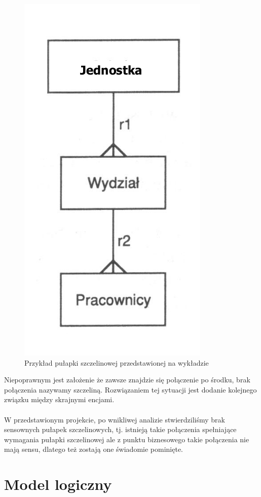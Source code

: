 \documentclass{mwrep}[15pt]
\begin{document}
\begin{figure}[H]
	\centering
	\includegraphics[scale=0.4]{./szczelina.png}
	\caption{Przykład pułapki szczelinowej przedstawionej na wykładzie\cite{Kowalczyk1}}
\end{figure}

Niepoprawnym jest założenie że zawsze znajdzie się połączenie po środku, brak połączenia nazywamy szczeliną. Rozwiązaniem 
tej sytuacji jest dodanie kolejnego związku między skrajnymi encjami. \\
\\
W przedstawionym projekcie, po wnikliwej analizie stwierdziliśmy brak sensownych pułapek szczelinowych, tj. istnieją 
takie połączenia spełniające wymagania pułapki szczelinowej ale z punktu biznesowego takie połączenia nie mają sensu, dlatego też 
zostają one świadomie pominięte.	


\chapter{Model logiczny}
\end{document}
